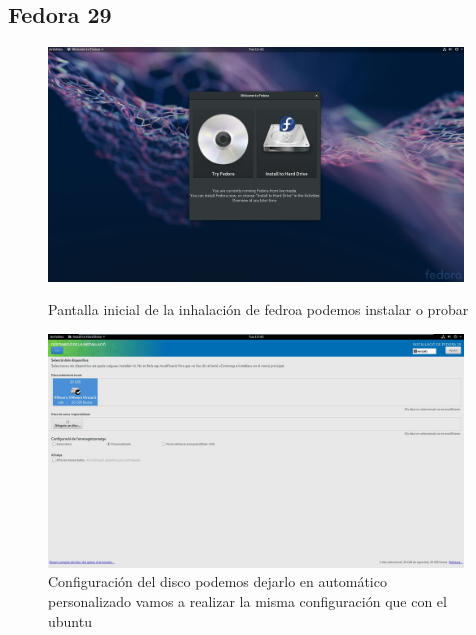 \documentclass[preprint,11pt]{elsarticle}
\begin{document}
\subsection{Fedora 29}
\begin{figure}[!htbp]
    \begin{center}
        \includegraphics[width=11cm]{anex/fedora1.JPG}
    \end{center}
    \caption{Pantalla inicial de la inhalación de fedroa podemos instalar o probar }
    \begin{center}
        \includegraphics[width=11cm]{anex/fedora2.JPG}
    \end{center}
    \caption{Configuración del disco podemos dejarlo en automático personalizado vamos a realizar la misma configuración que con el ubuntu}
\end{figure}
\end{document}
